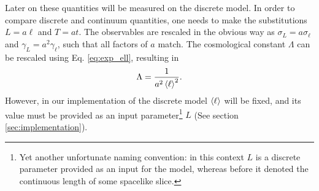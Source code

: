 Later on these quantities will be measured on the discrete model. In order to compare discrete and continuum quantities, one needs to make the substitutions $L = a \ell$ and $T = a t$. The observables are rescaled in the obvious way as $\sigma_L = a \sigma_\ell$ and $\gamma_L = a^2 \gamma_\ell$, such that all factors of $a$ match. The cosmological constant $\Lambda$ can be rescaled using Eq. \eqref{eq:exp_ell}, resulting in
\begin{equation}
    \Lambda = \frac{1}{a^2 \ev{\ell}^2}
    .
\end{equation}
However, in our implementation of the discrete model $\ev{\ell}$ will be fixed, and its value must be provided as an input parameter\footnote{Yet another unfortunate naming convention: in this context $L$ is a discrete parameter provided as an input for the model, whereas before it denoted the continuous length of some spacelike slice.} $L$ (See section \ref{sec:implementation}).
